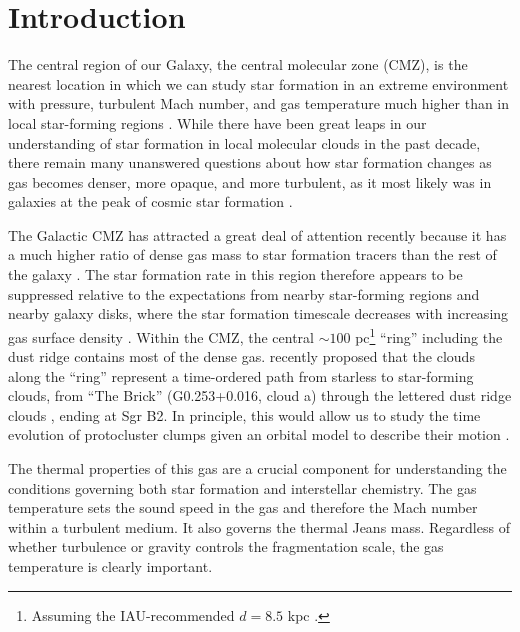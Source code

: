 
\maketitle


\section{Introduction}
\label{sec:intro}
The central region of our Galaxy, the central molecular zone (CMZ), is the
nearest location in which we can study star formation in an extreme
environment with pressure, turbulent Mach number, and gas temperature much
higher than in local star-forming regions \citep{Morris1996a}.  While there
have been great leaps in our understanding of star formation in local
molecular clouds in the past decade, there remain many unanswered questions
about how star formation changes as gas becomes denser, more opaque, and more
turbulent, as it most likely was in galaxies at the peak of cosmic star
formation \citep{Kruijssen2013a}.


The Galactic CMZ has attracted a great deal of attention recently because it
has a much higher ratio of dense gas mass to star formation tracers than the
rest of the galaxy
\citep{Longmore2013a,Longmore2012b,Longmore2013b,Kruijssen2014c,Yusef-Zadeh2009a,Immer2012a}.
The star formation rate in this region therefore appears to be suppressed
relative to the expectations from nearby star-forming regions and nearby galaxy
disks, where the star formation timescale decreases with increasing gas
surface density
\citep{Kennicutt1998a, Kennicutt2012a, Leroy2013a, Heiderman2010a}.  Within the
CMZ, the central $\sim100$ pc\footnote{Assuming the IAU-recommended $d=8.5$ kpc
\citep{Ghez2008a, Gillessen2009b, Reid2009a, Gillessen2013b}.} ``ring'' including
the  dust ridge \citep{Lis1991a, Sofue1995a, Molinari2011a} contains most of
the dense gas.  \citet{Longmore2013a} recently proposed that the clouds along
the ``ring'' \citep[which is more accurately described as a
stream;][]{Kruijssen2015a} represent a time-ordered path from starless to
star-forming clouds, from ``The Brick'' (G0.253+0.016, cloud a) through the
lettered dust ridge clouds \citep[clouds b,c,d,e,f][]{Lis1999a}, ending at Sgr
B2.  In principle, this would allow us to study the time evolution of
protocluster clumps given an orbital model to describe their motion
\citep{Kruijssen2015a}.

The thermal properties of this gas are a crucial component for understanding
the conditions governing both star formation and interstellar chemistry.  The
gas temperature sets the sound speed in the gas and therefore the Mach number
within a turbulent medium.  It also governs the thermal Jeans mass.  Regardless
of whether turbulence or gravity controls the fragmentation scale, the gas
temperature is clearly important.  

